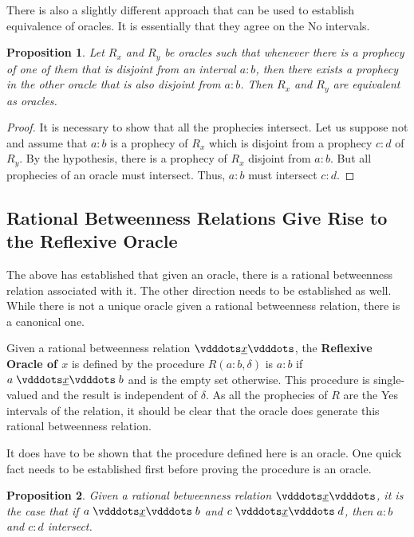 \documentclass[12pt]{article}
\newtheorem{proposition}{Proposition}[section]
\begin{document}
There is also a slightly different approach that can be used to establish equivalence of oracles. It is essentially that they agree on the No intervals. 

\begin{proposition}
    Let $R_x$ and $R_y$ be oracles such that whenever there is a prophecy of one of them that is disjoint from an interval $a:b$, then there exists a prophecy in the other oracle that is also disjoint from $a:b$. Then $R_x$ and $R_y$ are equivalent as oracles. 
\end{proposition}

\begin{proof}
    It is necessary to show that all the prophecies intersect. Let us suppose not and assume that $a:b$ is a prophecy of $R_x$ which is disjoint  from a prophecy $c:d$ of $R_y$. By the hypothesis, there is a prophecy of $R_x$ disjoint from $a:b$. But all prophecies of an oracle must intersect. Thus, $a:b$ must intersect $c:d$.
\end{proof}



\subsection{Rational Betweenness Relations Give Rise to the Reflexive Oracle}

The above has established that given an oracle, there is a rational betweenness relation associated with it. The other direction needs to be established as well. While there is not a unique oracle given a rational betweenness relation, there is a canonical one. 

Given a rational betweenness relation $\xrel$, the \textbf{Reflexive Oracle of $x$} is defined by the procedure $R(a:b, \delta)$ is $a:b$ if $a \xrel b$ and is the empty set otherwise. This procedure is single-valued and the result is independent of $\delta$. As all the prophecies of $R$ are the Yes intervals of the relation, it should be clear that the oracle does generate this rational betweenness relation. 

It does have to be shown that the procedure defined here is an oracle. One quick fact needs to be established first before proving the procedure is an oracle. 

\begin{proposition}
    Given a rational betweenness relation $\xrel$, it is the case that if $a \xrel b$ and $c \xrel d$, then $a:b$ and $c:d$ intersect. 
\end{proposition}
\end{document}
